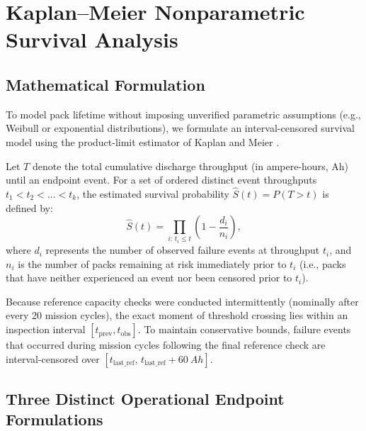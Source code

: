 \section{Kaplan--Meier Nonparametric Survival Analysis}

\subsection{Mathematical Formulation}

To model pack lifetime without imposing unverified parametric assumptions
(e.g., Weibull or exponential distributions), we formulate an
interval-censored survival model using the product-limit estimator of
Kaplan and Meier \cite{kaplan1958nonparametric}.

Let $T$ denote the total cumulative discharge throughput (in ampere-hours,
$\mathrm{Ah}$) until an endpoint event. For a set of ordered distinct event
throughputs $t_1 < t_2 < \dots < t_k$, the estimated survival probability
$\hat{S}(t) = P(T > t)$ is defined by:
\begin{equation}
  \hat{S}(t) = \prod_{i:\, t_i \le t} \left( 1 - \frac{d_i}{n_i} \right),
  \label{eq:kaplan_meier}
\end{equation}
where $d_i$ represents the number of observed failure events at throughput
$t_i$, and $n_i$ is the number of packs remaining at risk immediately prior
to $t_i$ (i.e., packs that have neither experienced an event nor been censored
prior to $t_i$).

Because reference capacity checks were conducted intermittently (nominally
after every 20 mission cycles), the exact moment of threshold crossing
lies within an inspection interval $[t_{\mathrm{prev}}, t_{\mathrm{obs}}]$.
To maintain conservative bounds, failure events that occurred during mission
cycles following the final reference check are interval-censored over
$[t_{\mathrm{last\_ref}},\, t_{\mathrm{last\_ref}} + \SI{60}{Ah}]$.

\subsection{Three Distinct Operational Endpoint Formulations}

